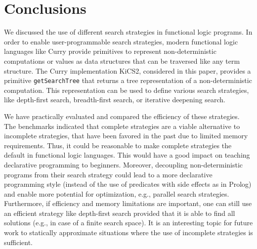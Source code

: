 \documentclass[english]{lni}
\newcommand{\code}[1]{\texttt{\small{}#1}}
\begin{document}
\section{Conclusions}
\label{sec:conclusions}

We discussed the use of different search strategies
in functional logic programs.
In order to enable user-programmable search strategies,
modern functional logic languages like Curry
provide primitives to represent non-deterministic computations
or values as data structures that can be traversed like
any term structure.
The Curry implementation KiCS2, considered in this paper,
provides a primitive \code{getSearchTree}
that returns a tree representation of a non-deterministic computation.
This representation can be used to define various search strategies,
like depth-first search, breadth-first search, or iterative deepening
search.

We have practically evaluated and compared
the efficiency of these strategies.
The benchmarks indicated that complete strategies
are a viable alternative to incomplete strategies,
that have been favored in the past due to limited memory requirements.
Thus, it could be reasonable to make
complete strategies the default in functional logic languages.
This would have a good impact on teaching declarative programming
to beginners.
Moreover, decoupling non-deterministic programs
from their search strategy could lead to a more declarative
programming style (instead of the use of predicates with
side effects as in Prolog) and enable more potential for
optimization, e.g., parallel search strategies.
Furthermore, if efficiency and memory limitations are important,
one can still use an efficient strategy like depth-first search
provided that it is able to find all solutions
(e.g., in case of a finite search space).
It is an interesting topic for future work
to statically approximate situations where
the use of incomplete strategies is sufficient.


%

\end{document}
